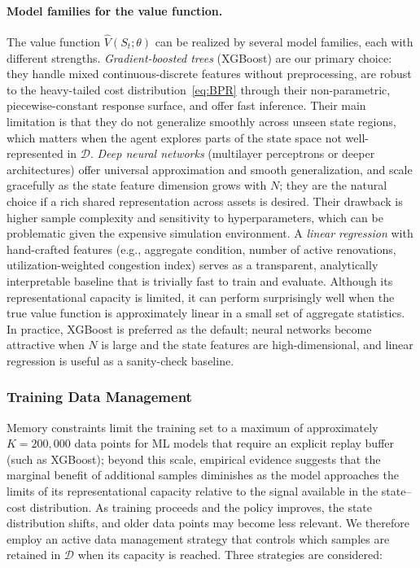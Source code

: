 \documentclass[3p, twocolumn]{elsarticle}
\begin{document}
\paragraph{Model families for the value function.}
The value function $\hat{V}(S_t; \theta)$ can be realized by several model families, each with different strengths. \emph{Gradient-boosted trees} (XGBoost) are our primary choice: they handle mixed continuous-discrete features without preprocessing, are robust to the heavy-tailed cost distribution~\eqref{eq:BPR} through their non-parametric, piecewise-constant response surface, and offer fast inference. Their main limitation is that they do not generalize smoothly across unseen state regions, which matters when the agent explores parts of the state space not well-represented in $\mathcal{D}$. \emph{Deep neural networks} (multilayer perceptrons or deeper architectures) offer universal approximation and smooth generalization, and scale gracefully as the state feature dimension grows with $N$; they are the natural choice if a rich shared representation across assets is desired. Their drawback is higher sample complexity and sensitivity to hyperparameters, which can be problematic given the expensive simulation environment. A \emph{linear regression} with hand-crafted features (e.g., aggregate condition, number of active renovations, utilization-weighted congestion index) serves as a transparent, analytically interpretable baseline that is trivially fast to train and evaluate. Although its representational capacity is limited, it can perform surprisingly well when the true value function is approximately linear in a small set of aggregate statistics. In practice, XGBoost is preferred as the default; neural networks become attractive when $N$ is large and the state features are high-dimensional, and linear regression is useful as a sanity-check baseline.

\subsubsection{Training Data Management}
\label{subsubsec:training_data}

Memory constraints limit the training set to a maximum of approximately $K = 200{,}000$ data points for ML models that require an explicit replay buffer (such as XGBoost); beyond this scale, empirical evidence suggests that the marginal benefit of additional samples diminishes as the model approaches the limits of its representational capacity relative to the signal available in the state--cost distribution. As training proceeds and the policy improves, the state distribution shifts, and older data points may become less relevant. We therefore employ an active data management strategy that controls which samples are retained in $\mathcal{D}$ when its capacity is reached. Three strategies are considered:
\end{document}
